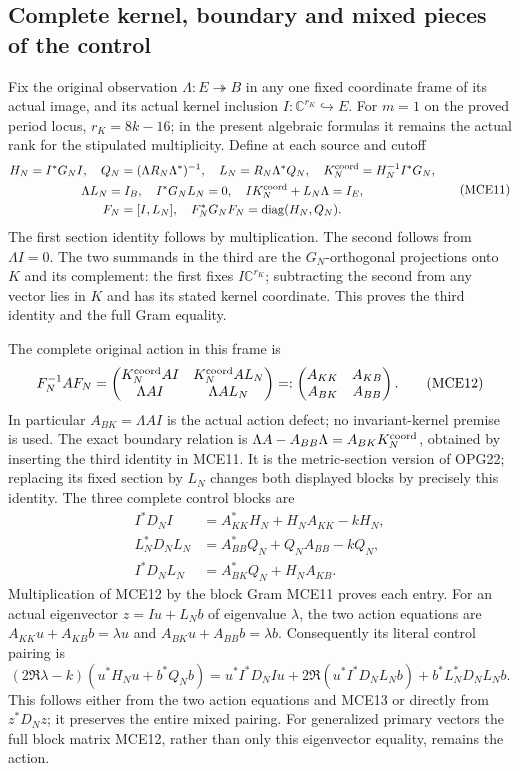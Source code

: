 \documentclass[11pt,a4paper]{article}
\begin{document}
\subsection{Complete kernel, boundary and mixed pieces of the control}
Fix the original observation $\Lambda:E\twoheadrightarrow B$
in any one fixed coordinate frame of its actual image, and its
actual kernel inclusion $I:\mathbb C^{r_K}\hookrightarrow E$.
For $m=1$ on the proved period locus, $r_K=8k-16$; in the present
algebraic formulas it remains the actual rank for the stipulated
multiplicity. Define at each source and cutoff
\[
 \begin{gathered}
 H_N=I^*G_NI,\quad Q_N=(\Lambda R_N\Lambda^*)^{-1},\quad
 L_N=R_N\Lambda^*Q_N,\quad
 K_N^{\rm coord}=H_N^{-1}I^*G_N,\\
 \Lambda L_N=I_B,\quad I^*G_NL_N=0,\quad
 I K_N^{\rm coord}+L_N\Lambda=I_E,\\
 F_N=[I,L_N],\quad F_N^*G_NF_N=\operatorname{diag}(H_N,Q_N).
 \end{gathered}\tag{MCE11}
\]
The first section identity follows by multiplication. The second
follows from $\Lambda I=0$. The two summands in the third are
the $G_N$-orthogonal projections onto $K$ and its complement:
the first fixes $I\mathbb C^{r_K}$; subtracting the second from
any vector lies in $K$ and has its stated kernel coordinate.
This proves the third identity and the full Gram equality.

The complete original action in this frame is
\[
 F_N^{-1}AF_N=
 \begin{pmatrix}
 K_N^{\rm coord}AI&K_N^{\rm coord}AL_N\\
 \Lambda AI&\Lambda AL_N
 \end{pmatrix}=:\begin{pmatrix}A_{KK}&A_{KB}\\A_{BK}&A_{BB}\end{pmatrix}.
 \tag{MCE12}
\]
In particular $A_{BK}=\Lambda AI$ is the actual action defect;
no invariant-kernel premise is used. The exact boundary relation is
$\Lambda A-A_{BB}\Lambda=A_{BK}K_N^{\rm coord}$, obtained by
inserting the third identity in MCE11. It is the metric-section
version of OPG22; replacing its fixed section by $L_N$ changes
both displayed blocks by precisely this identity.
The three complete control blocks are
\[
 \begin{split}
 I^*D_NI&=A_{KK}^*H_N+H_NA_{KK}-kH_N,\\
 L_N^*D_NL_N&=A_{BB}^*Q_N+Q_NA_{BB}-kQ_N,\\
 I^*D_NL_N&=A_{BK}^*Q_N+H_NA_{KB}.
 \end{split}\tag{MCE13}
\]
Multiplication of MCE12 by the block Gram MCE11 proves each entry.
For an actual eigenvector $z=Iu+L_Nb$ of eigenvalue $\lambda$,
the two action equations are
$A_{KK}u+A_{KB}b=\lambda u$ and
$A_{BK}u+A_{BB}b=\lambda b$. Consequently its literal control
pairing is
\[
 (2\Re\lambda-k)(u^*H_Nu+b^*Q_Nb)
 =u^*I^*D_NIu+2\Re(u^*I^*D_NL_Nb)+b^*L_N^*D_NL_Nb.
 \tag{MCE14}
\]
This follows either from the two action equations and MCE13 or
directly from $z^*D_Nz$; it preserves the entire mixed pairing.
For generalized primary vectors the full block matrix MCE12,
rather than only this eigenvector equality, remains the action.
\end{document}
